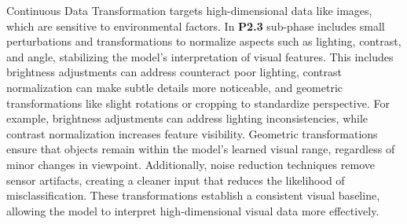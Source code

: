 
Continuous Data Transformation targets high-dimensional data like images, which are sensitive to environmental factors.  In \textbf{P2.3} sub-phase includes small perturbations and transformations to normalize aspects such as lighting, contrast, and angle, stabilizing the model’s interpretation of visual features. This includes brightness adjustments can address counteract poor lighting, contrast normalization can make subtle details more noticeable, and geometric transformations like slight rotations or cropping to standardize perspective. For example, brightness adjustments can address lighting inconsistencies, while contrast normalization increases feature visibility. Geometric transformations ensure that objects remain within the model’s learned visual range, regardless of minor changes in viewpoint. Additionally, noise reduction techniques remove sensor artifacts, creating a cleaner input that reduces the likelihood of misclassification. These transformations establish a consistent visual baseline, allowing the model to interpret high-dimensional visual data more effectively.


